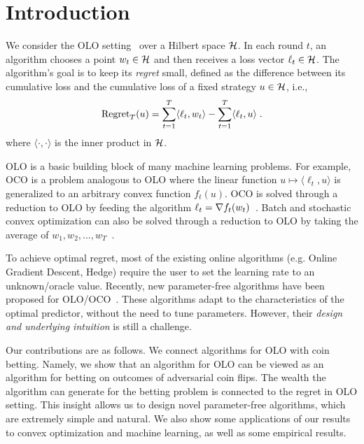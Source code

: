 \section{Introduction}
\label{section:introduction}

We consider the \ac{OLO} setting~\citep{Cesa-Bianchi-Lugosi-2006,
Shalev-Shwartz-2011} over a Hilbert space $\mathcal{H}$. In each round $t$, an algorithm
chooses a point $w_t \in \mathcal{H}$ and then receives a loss vector $\ell_t \in \mathcal{H}$.
The algorithm's goal is to keep its \emph{regret} small, defined as the
difference between its cumulative loss and the cumulative loss of a fixed
strategy $u \in \mathcal{H}$, i.e.,
\[
\operatorname{Regret}_T(u) = \sum_{t=1}^T \langle \ell_t, w_t \rangle - \sum_{t=1}^T \langle \ell_t, u \rangle  \; .
\]
where $\langle \cdot, \cdot \rangle$ is the inner product in $\mathcal{H}$.

\ac{OLO} is a basic building block of many machine learning problems. For
example, \ac{OCO} is a problem analogous to \ac{OLO} where
the linear function $u \mapsto \langle \ell_t, u \rangle$
is generalized to an arbitrary convex function $f_t(u)$. \ac{OCO} is solved
through a reduction to \ac{OLO} by feeding the algorithm $\ell_t = \nabla
f_t(w_t)$~\citep{Shalev-Shwartz-2011}.  Batch and stochastic convex
optimization can also be solved through a reduction to \ac{OLO} by
taking the average of $w_1, w_2, \dots, w_T$~\citep{Shalev-Shwartz-2011}.

To achieve optimal regret, most of the existing online algorithms (e.g.  Online
Gradient Descent, Hedge) require the user to set the learning rate to an
unknown/oracle value. Recently, new parameter-free algorithms have been proposed
for \ac{OLO}/\ac{OCO}~\citep{Chaudhuri-Freund-Hsu-2009, Chernov-Vovk-2010,
Streeter-McMahan-2012, Orabona-2013, McMahan-Abernethy-2013,
McMahan-Orabona-2014, Luo-Schapire-2014, Orabona-2014, Luo-Schapire-2015,
Koolen-van-Erven-2015}.  These algorithms adapt to the characteristics of the
optimal predictor, without the need to tune parameters. However, their
\emph{design and underlying intuition} is still a challenge.

Our contributions are as follows. We connect algorithms for \ac{OLO} with coin
betting. Namely, we show that an algorithm for \ac{OLO} can be viewed as an
algorithm for betting on outcomes of adversarial coin flips. The wealth the
algorithm can generate for the betting problem is connected to the regret in
\ac{OLO} setting. This insight allows us to design novel parameter-free
algorithms, which are extremely simple and natural. We also show some
applications of our results to convex optimization and machine learning, as well
as some empirical results.
